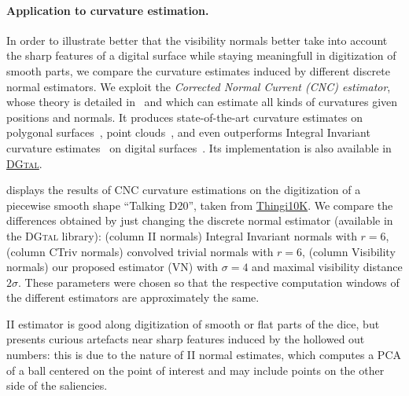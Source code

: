 \documentclass[runningheads]{llncs}
\begin{document}




    \paragraph{Application to curvature estimation.}
    In order to illustrate better that the visibility normals better
    take into account the sharp features of a digital surface while
    staying meaningfull in digitization of smooth parts, we compare
    the curvature estimates induced by different discrete normal
    estimators. We exploit the \emph{Corrected Normal Current (CNC)
    estimator}, whose theory is detailed in~\cite{lachaud:2022-dcg}
    and which can estimate all kinds of curvatures given positions and
    normals. It produces state-of-the-art curvature estimates on
    polygonal surfaces~\cite{lachaud:2020-cgf}, point clouds~\cite{lachaud:2023-cgf}, and even outperforms Integral Invariant
    curvature estimates~\cite{coeurjolly:2014-cviu} on digital
    surfaces~\cite{lachaud:2022-dcg}. Its implementation is also
    available in    \href{https://dgtal-team.github.io/doc-nightly/moduleCurvatureMeasures.html}{\textsc{DGtal}}.

     displays the results of CNC curvature
    estimations on the digitization of a piecewise smooth shape
    ``Talking D20'', taken from
    \href{https://ten-thousand-models.appspot.com/detail.html?file_id=1533028}{Thingi10K}.
    We compare the differences obtained by just changing the discrete
    normal estimator (available in the \textsc{DGtal} library):
    (column II normals) Integral Invariant normals with $r=6$, (column
    CTriv normals) convolved trivial normals with $r=6$, (column
    Visibility normals) our proposed estimator (VN) with $\sigma=4$ and
    maximal visibility distance $2\sigma$. These parameters were
    chosen so that the respective computation windows of the different
    estimators are approximately the same.

    II estimator is good along digitization of smooth or flat parts of
    the dice, but presents curious artefacts near sharp features
    induced by the hollowed out numbers: this is due to the nature of
    II normal estimates, which computes a PCA of a ball centered on
    the point of interest and may include points on the other side of
    the saliencies.
\end{document}
